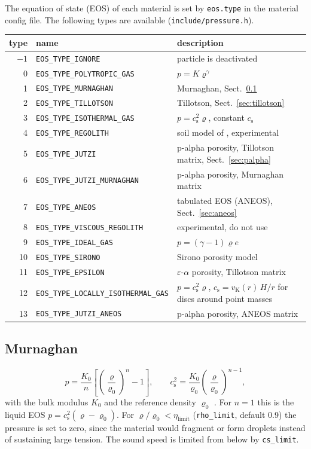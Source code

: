 \documentclass[10pt,fleqn,twoside]{article}
\newcommand{\code}[1]{\texttt{#1}}
\begin{document}
The equation of state (EOS) of each material is set by \code{eos.type} in the material config file. The following
types are available (\code{include/pressure.h}).

\begin{center}
\small
\begin{tabular}{r l L{8.0cm}}
\toprule
type & name & description \\
\midrule
$-1$ & \code{EOS\_TYPE\_IGNORE} & particle is deactivated \\
0 & \code{EOS\_TYPE\_POLYTROPIC\_GAS} & $p = K\varrho^\gamma$ \\
1 & \code{EOS\_TYPE\_MURNAGHAN} & Murnaghan, Sect.~\ref{sec:murnaghan} \\
2 & \code{EOS\_TYPE\_TILLOTSON} & Tillotson, Sect.~\ref{sec:tillotson} \\
3 & \code{EOS\_TYPE\_ISOTHERMAL\_GAS} & $p = c_\mathrm{s}^2\varrho$, constant $c_\mathrm{s}$ \\
4 & \code{EOS\_TYPE\_REGOLITH} & soil model of \citet{bui2008}, experimental \\
5 & \code{EOS\_TYPE\_JUTZI} & p-alpha porosity, Tillotson matrix, Sect.~\ref{sec:palpha} \\
6 & \code{EOS\_TYPE\_JUTZI\_MURNAGHAN} & p-alpha porosity, Murnaghan matrix \\
7 & \code{EOS\_TYPE\_ANEOS} & tabulated EOS (ANEOS), Sect.~\ref{sec:aneos} \\
8 & \code{EOS\_TYPE\_VISCOUS\_REGOLITH} & experimental, do not use \\
9 & \code{EOS\_TYPE\_IDEAL\_GAS} & $p = (\gamma-1)\varrho e$ \\
10 & \code{EOS\_TYPE\_SIRONO} & Sirono porosity model \\
11 & \code{EOS\_TYPE\_EPSILON} & $\varepsilon$-$\alpha$ porosity, Tillotson matrix \\
12 & \code{EOS\_TYPE\_LOCALLY\_ISOTHERMAL\_GAS} & $p = c_\mathrm{s}^2\varrho$, $c_\mathrm{s} = v_\mathrm{K}(r)\,H/r$
  for discs around point masses \\
13 & \code{EOS\_TYPE\_JUTZI\_ANEOS} & p-alpha porosity, ANEOS matrix \\
\bottomrule
\end{tabular}
\end{center}

\subsection{Murnaghan}
\label{sec:murnaghan}
\begin{equation}
 p = \frac{K_0}{n}\left[\left(\frac{\varrho}{\varrho_0}\right)^n - 1\right], \qquad
 c_\mathrm{s}^2 = \frac{K_0}{\varrho_0}\left(\frac{\varrho}{\varrho_0}\right)^{n-1},
\end{equation}
with the bulk modulus $K_0$ and the reference density $\varrho_0$ \citep{melosh1996impact}. For $n = 1$ this is the
liquid EOS $p = c_\mathrm{s}^2(\varrho-\varrho_0)$. For $\varrho/\varrho_0 < \eta_\mathrm{limit}$
(\code{rho\_limit}, default 0.9) the pressure is set to zero, since the material would fragment or form droplets
instead of sustaining large tension. The sound speed is limited from below by \code{cs\_limit}.
\end{document}
